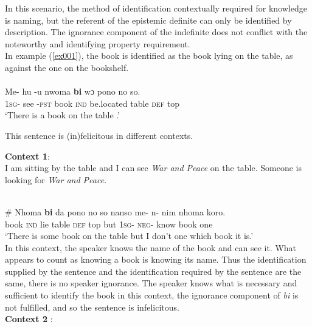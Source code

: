\documentclass[output=paper,modfonts]{langsci/langscibook}
\begin{document}
 \z  
In this scenario, the method of identification contextually required for knowledge is naming, but the referent of the epistemic definite can only be identified by description. The ignorance component of the indefinite does not conflict with the noteworthy and identifying property requirement.\\

In example (\ref{ex001}), the book is identified as the book lying on the table, as against the one on the bookshelf.  \\
\ea\label{ex001}\\
\gll Me- hu -u nwoma \textbf{bi} wɔ pono no so.\\
	     \textsc{1sg}- see -\textsc{pst}  book \textsc{ind} be.located table \textsc{def}  top\\

\glt `There is a book on the table .'\\

 \z 
 
This sentence is (in)felicitous in different contexts.

\textbf{Context 1}:\\
I am sitting by the table and I can see \emph{\emph{War and Peace}} on the table. Someone is looking for \emph{\emph{War and Peace}}.

\ea\label{ex00}\\
\gll \# Nhoma \textbf{bi} da pono no so nanso me- n- nim nhoma koro.\\
	     {} book \textsc{ind}  lie table \textsc{def}  top but \textsc{1sg}- \textsc{neg}- know book one\\

\glt `There is some book on the table but I don't one which book it is.'\\

 \z  In this context, the speaker knows the name of the book and can see it. What appears to count as knowing a book is knowing its name. Thus the identification supplied by the sentence and the identification required by the sentence are the same, there is no speaker ignorance. The speaker knows what is necessary and sufficient to identify the book in this context, the ignorance component of \emph{bi} is not fulfilled, and so the sentence is infelicitous. \\

\textbf{Context 2} :\\
\end{document}
